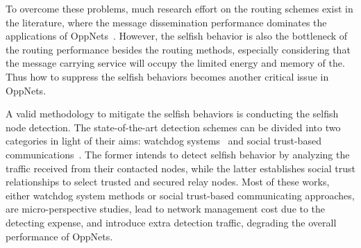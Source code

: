 To overcome these problems, 
much research effort on the routing schemes
exist in the literature,
where the message dissemination performance
dominates the applications of
OppNets~\cite{DBLP:conf/sigcomm/SouzaMSMCC16,
DBLP:conf/mobicom/RadenkovicH17,
DBLP:journals/comsur/JedariXN18,
DBLP:journals/tmc/LoretiB20}.
However, the selfish behavior is also
the bottleneck of the routing performance besides the routing methods,
especially considering that
the message carrying service will occupy
the limited energy and memory of the.
Thus how to suppress the selfish behaviors
becomes another critical issue in OppNets.

A valid methodology to mitigate the selfish behaviors
is conducting the selfish node detection.
The state-of-the-art detection schemes
can be divided into two categories
in light of their aims:
watchdog systems~\cite{DBLP:conf/mobicom/MartiGLB00,
DBLP:journals/tmc/Hernandez-Orallo15,
DBLP:journals/tie/DiasRXM15,
DBLP:journals/fgcs/JedariXCDTA19}
and social trust-based communications~\cite{DBLP:journals/tpds/ZhuDGDC14,
DBLP:journals/tdsc/ChoC18,
DBLP:journals/tmc/ChoiSLW12}.
The former intends to detect selfish behavior
by analyzing the traffic received
from their contacted nodes,
while the latter establishes social trust relationships
to select trusted and secured relay nodes.
Most of these works,
either watchdog system methods
or social trust-based communicating approaches,
are micro-perspective studies,
lead to network management cost
due to the detecting expense,
and introduce extra detection traffic,
degrading the overall performance of OppNets.

